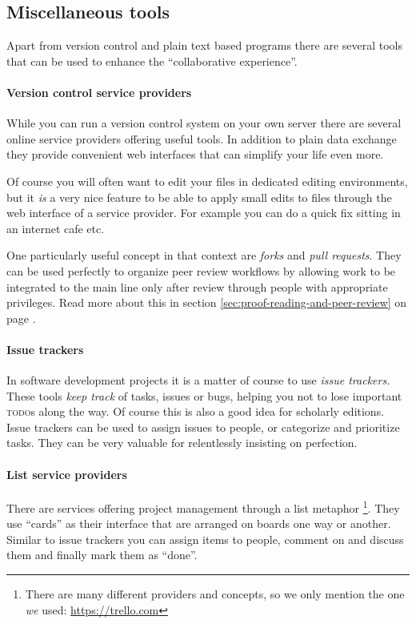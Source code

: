 \documentclass[11pt,a4paper]{article}
\begin{document}
\subsection{Miscellaneous tools}
Apart from version control and plain text based programs there are several tools that
can be used to enhance the “collaborative experience”.

\paragraph{Version control service providers}
While you can run a version control system on your own server there are several online service providers offering useful tools. In addition to plain data exchange they
provide convenient web interfaces that can simplify your life even more.

Of course you will often want to edit your files in dedicated editing environments, but
it \emph{is} a very nice feature to be able to apply small edits to files through the web 
interface of a service provider. For example you can do a quick fix sitting in an internet
cafe etc.

One particularly useful concept in that context are \emph{forks} and \emph{pull requests}.
They can be used perfectly to organize peer review workflows by allowing work to be
integrated to the main line only after review through people with appropriate privileges.
Read more about this in section \ref{sec:proof-reading-and-peer-review} on page \pageref{sec:proof-reading-and-peer-review}.

\paragraph{Issue trackers}
In software development projects it is a matter of course to use \emph{issue trackers.}
These tools \emph{keep track} of tasks, issues or bugs, helping you not to lose important
\textsc{todo}s along the way. Of course this is also a good idea for scholarly editions. Issue
trackers can be used to assign issues to people, or categorize and prioritize tasks.
They can be very valuable for relentlessly insisting on perfection.

\paragraph{List service providers}
There are services offering project management through a list metaphor%
\footnote{There are many different providers and concepts, so we only mention the one
\emph{we} used: \url{https://trello.com}}.
They use “cards” as their interface that are arranged on boards one way or another.
Similar to issue trackers you can assign items to people, comment on and discuss them and
finally mark them as “done”.
\end{document}
